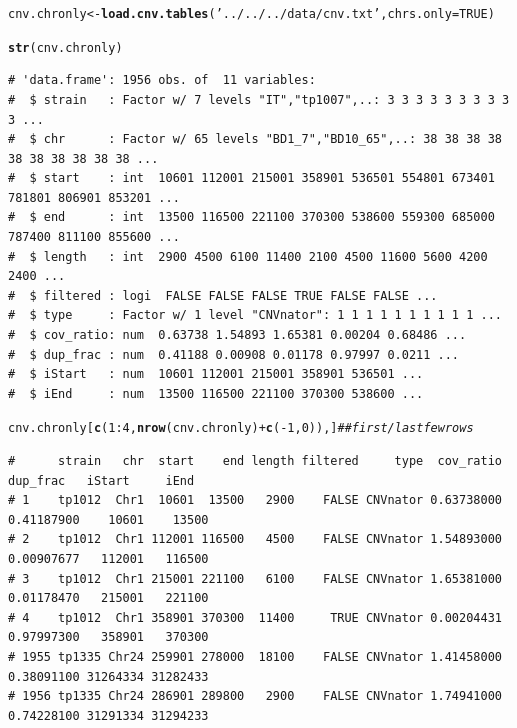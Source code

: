 \documentclass{article}\usepackage[]{graphicx}\usepackage[]{color}
\makeatletter
\newcommand{\hlnum}[1]{\textcolor[rgb]{0.686,0.059,0.569}{#1}}%
\newcommand{\hlstr}[1]{\textcolor[rgb]{0.192,0.494,0.8}{#1}}%
\newcommand{\hlcom}[1]{\textcolor[rgb]{0.678,0.584,0.686}{\textit{#1}}}%
\newcommand{\hlopt}[1]{\textcolor[rgb]{0,0,0}{#1}}%
\newcommand{\hlstd}[1]{\textcolor[rgb]{0.345,0.345,0.345}{#1}}%
\newcommand{\hlkwb}[1]{\textcolor[rgb]{0.69,0.353,0.396}{#1}}%
\newcommand{\hlkwc}[1]{\textcolor[rgb]{0.333,0.667,0.333}{#1}}%
\newcommand{\hlkwd}[1]{\textcolor[rgb]{0.737,0.353,0.396}{\textbf{#1}}}%
\newenvironment{kframe}{%
 \def\at@end@of@kframe{}%
 \ifinner\ifhmode%
  \def\at@end@of@kframe{\end{minipage}}%
  \begin{minipage}{\columnwidth}%
 \fi\fi%
 \def\FrameCommand##1{\hskip\@totalleftmargin \hskip-\fboxsep
 \colorbox{shadecolor}{##1}\hskip-\fboxsep
     \hskip-\linewidth \hskip-\@totalleftmargin \hskip\columnwidth}%
 \MakeFramed {\advance\hsize-\width
   \@totalleftmargin\z@ \linewidth\hsize
   \@setminipage}}%
 {\par\unskip\endMakeFramed%
 \at@end@of@kframe}
\newenvironment{knitrout}{}{} %
\makeatother
\begin{document}
\begin{knitrout}\footnotesize
{}\color{fgcolor}\begin{kframe}
\begin{alltt}
\hlstd{cnv.chronly} \hlkwb{<-} \hlkwd{load.cnv.tables}\hlstd{(}\hlstr{'../../../data/cnv.txt'}\hlstd{,} \hlkwc{chrs.only}\hlstd{=}\hlnum{TRUE}\hlstd{)}

\hlkwd{str}\hlstd{(cnv.chronly)}
\end{alltt}
\begin{verbatim}
# 'data.frame':	1956 obs. of  11 variables:
#  $ strain   : Factor w/ 7 levels "IT","tp1007",..: 3 3 3 3 3 3 3 3 3 3 ...
#  $ chr      : Factor w/ 65 levels "BD1_7","BD10_65",..: 38 38 38 38 38 38 38 38 38 38 ...
#  $ start    : int  10601 112001 215001 358901 536501 554801 673401 781801 806901 853201 ...
#  $ end      : int  13500 116500 221100 370300 538600 559300 685000 787400 811100 855600 ...
#  $ length   : int  2900 4500 6100 11400 2100 4500 11600 5600 4200 2400 ...
#  $ filtered : logi  FALSE FALSE FALSE TRUE FALSE FALSE ...
#  $ type     : Factor w/ 1 level "CNVnator": 1 1 1 1 1 1 1 1 1 1 ...
#  $ cov_ratio: num  0.63738 1.54893 1.65381 0.00204 0.68486 ...
#  $ dup_frac : num  0.41188 0.00908 0.01178 0.97997 0.0211 ...
#  $ iStart   : num  10601 112001 215001 358901 536501 ...
#  $ iEnd     : num  13500 116500 221100 370300 538600 ...
\end{verbatim}
\begin{alltt}
\hlstd{cnv.chronly[}\hlkwd{c}\hlstd{(}\hlnum{1}\hlopt{:}\hlnum{4}\hlstd{,}\hlkwd{nrow}\hlstd{(cnv.chronly)}\hlopt{+}\hlkwd{c}\hlstd{(}\hlopt{-}\hlnum{1}\hlstd{,}\hlnum{0}\hlstd{)),]}                     \hlcom{## first/last few rows}
\end{alltt}
\begin{verbatim}
#      strain   chr  start    end length filtered     type  cov_ratio   dup_frac   iStart     iEnd
# 1    tp1012  Chr1  10601  13500   2900    FALSE CNVnator 0.63738000 0.41187900    10601    13500
# 2    tp1012  Chr1 112001 116500   4500    FALSE CNVnator 1.54893000 0.00907677   112001   116500
# 3    tp1012  Chr1 215001 221100   6100    FALSE CNVnator 1.65381000 0.01178470   215001   221100
# 4    tp1012  Chr1 358901 370300  11400     TRUE CNVnator 0.00204431 0.97997300   358901   370300
# 1955 tp1335 Chr24 259901 278000  18100    FALSE CNVnator 1.41458000 0.38091100 31264334 31282433
# 1956 tp1335 Chr24 286901 289800   2900    FALSE CNVnator 1.74941000 0.74228100 31291334 31294233
\end{verbatim}
\end{kframe}
\end{knitrout}
\end{document}
